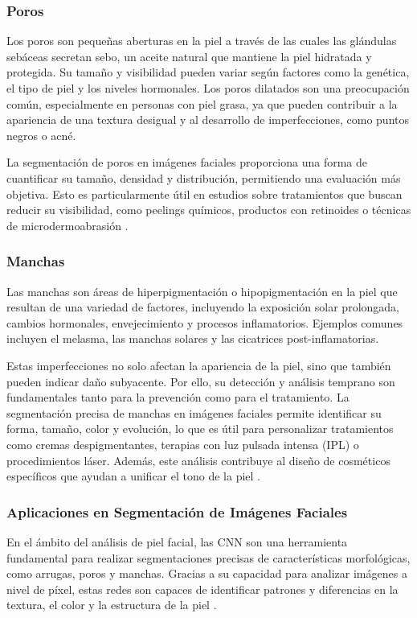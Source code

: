 \subsubsection{Poros}
Los poros son pequeñas aberturas en la piel a través de las cuales las glándulas sebáceas secretan sebo, un aceite natural que mantiene la piel hidratada y protegida. Su tamaño y visibilidad pueden variar según factores como la genética, el tipo de piel y los niveles hormonales. Los poros dilatados son una preocupación común, especialmente en personas con piel grasa, ya que pueden contribuir a la apariencia de una textura desigual y al desarrollo de imperfecciones, como puntos negros o acné.

La segmentación de poros en imágenes faciales proporciona una forma de cuantificar su tamaño, densidad y distribución, permitiendo una evaluación más objetiva. Esto es particularmente útil en estudios sobre tratamientos que buscan reducir su visibilidad, como peelings químicos, productos con retinoides o técnicas de microdermoabrasión \parencite{autor2020poros}.

\subsubsection{Manchas}
Las manchas son áreas de hiperpigmentación o hipopigmentación en la piel que resultan de una variedad de factores, incluyendo la exposición solar prolongada, cambios hormonales, envejecimiento y procesos inflamatorios. Ejemplos comunes incluyen el melasma, las manchas solares y las cicatrices post-inflamatorias.

Estas imperfecciones no solo afectan la apariencia de la piel, sino que también pueden indicar daño subyacente. Por ello, su detección y análisis temprano son fundamentales tanto para la prevención como para el tratamiento. La segmentación precisa de manchas en imágenes faciales permite identificar su forma, tamaño, color y evolución, lo que es útil para personalizar tratamientos como cremas despigmentantes, terapias con luz pulsada intensa (IPL) o procedimientos láser. Además, este análisis contribuye al diseño de cosméticos específicos que ayudan a unificar el tono de la piel \cite{autor2019manchas}.
\subsubsection{Aplicaciones en Segmentación de Imágenes Faciales}  
En el ámbito del análisis de piel facial, las CNN son una herramienta fundamental para realizar segmentaciones precisas de características morfológicas, como arrugas, poros y manchas. Gracias a su capacidad para analizar imágenes a nivel de píxel, estas redes son capaces de identificar patrones y diferencias en la textura, el color y la estructura de la piel \parencite{autor2021deep}.

